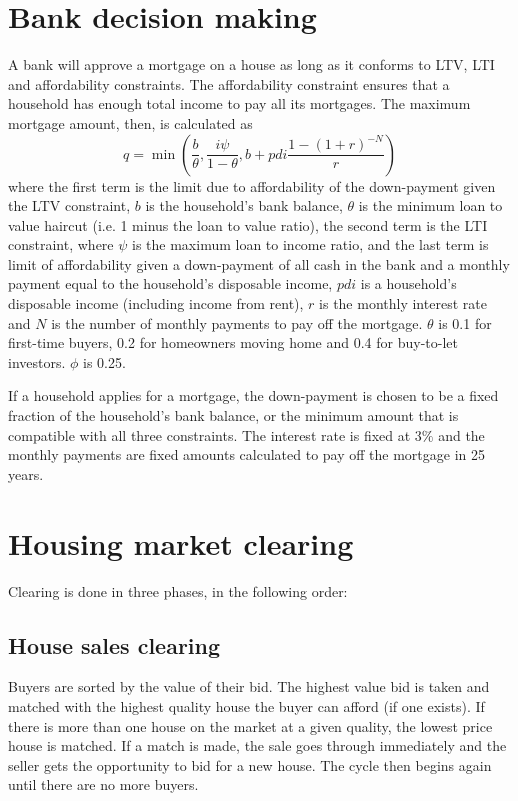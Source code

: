 \documentclass[a4paper]{article}
\begin{document}
\section{Bank decision making}
A bank will approve a mortgage on a house as long as it conforms to  LTV, LTI and affordability constraints. The affordability constraint ensures that a household has enough total income to pay all its mortgages. The maximum mortgage amount, then, is calculated as
\begin{equation}
q = \min\left(\frac{b}{\theta}, \frac{i\psi}{1-\theta}, b + pdi\frac{1-(1+r)^{-N}}{r}\right)
\end{equation}
where the first term is the limit due to affordability of the down-payment given the LTV constraint, $b$ is the household's bank balance, $\theta$ is the minimum loan to value haircut (i.e. 1 minus the loan to value ratio), the second term is the LTI constraint, where $\psi$ is the maximum loan to income ratio, and the last term is limit of affordability given a down-payment of all cash in the bank and a monthly payment equal to the household's disposable income, $pdi$ is a household's disposable income (including income from rent), $r$ is the monthly interest rate and $N$ is the number of monthly payments to pay off the mortgage. $\theta$ is 0.1 for first-time buyers, 0.2 for homeowners moving home and 0.4 for buy-to-let investors. $\phi$ is 0.25.

If a household applies for a mortgage, the down-payment is chosen to be a fixed fraction of the household's bank balance, or the minimum amount that is compatible with all three constraints. The interest rate is fixed at $3\%$ and the monthly payments are fixed amounts calculated to pay off the mortgage in 25 years.

\section{Housing market clearing}

Clearing is done in three phases, in the following order:

\subsection{House sales clearing}

Buyers are sorted by the value of their bid. The highest value bid is taken and matched with the highest quality house the buyer can afford (if one exists). If there is more than one house on the market at a given quality, the lowest price house is matched. If a match is made, the sale goes through immediately and the seller gets the opportunity to bid for a new house. The cycle then begins again until there are no more buyers.
\end{document}
